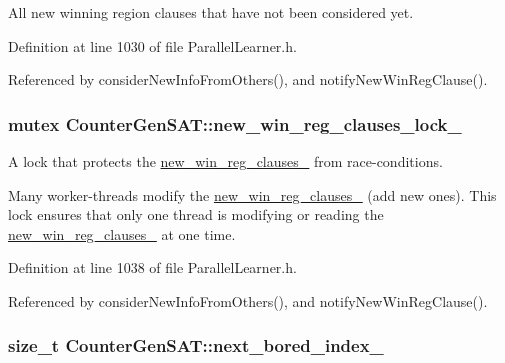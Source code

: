All new winning region clauses that have not been considered yet. 



Definition at line 1030 of file Parallel\-Learner.\-h.



Referenced by consider\-New\-Info\-From\-Others(), and notify\-New\-Win\-Reg\-Clause().

\hypertarget{classCounterGenSAT_a120e7ea918e720bedb9b35a40e354307}{
\subsubsection[{new\-\_\-win\-\_\-reg\-\_\-clauses\-\_\-lock\-\_\-}]{\setlength{\rightskip}{0pt plus 5cm}mutex Counter\-Gen\-S\-A\-T\-::new\-\_\-win\-\_\-reg\-\_\-clauses\-\_\-lock\-\_\-\hspace{0.3cm}{\ttfamily [protected]}}}\label{classCounterGenSAT_a120e7ea918e720bedb9b35a40e354307}


A lock that protects the \hyperlink{classCounterGenSAT_a5a379bda175a32e3d4ccc0771fde024d}{new\-\_\-win\-\_\-reg\-\_\-clauses\-\_\-} from race-\/conditions. 

Many worker-\/threads modify the \hyperlink{classCounterGenSAT_a5a379bda175a32e3d4ccc0771fde024d}{new\-\_\-win\-\_\-reg\-\_\-clauses\-\_\-} (add new ones). This lock ensures that only one thread is modifying or reading the \hyperlink{classCounterGenSAT_a5a379bda175a32e3d4ccc0771fde024d}{new\-\_\-win\-\_\-reg\-\_\-clauses\-\_\-} at one time. 

Definition at line 1038 of file Parallel\-Learner.\-h.



Referenced by consider\-New\-Info\-From\-Others(), and notify\-New\-Win\-Reg\-Clause().

\hypertarget{classCounterGenSAT_a404764a6142a0cd55e1b3e40d2e0483b}{
\subsubsection[{next\-\_\-bored\-\_\-index\-\_\-}]{\setlength{\rightskip}{0pt plus 5cm}size\-\_\-t Counter\-Gen\-S\-A\-T\-::next\-\_\-bored\-\_\-index\-\_\-\hspace{0.3cm}{\ttfamily [protected]}}}\label{classCounterGenSAT_a404764a6142a0cd55e1b3e40d2e0483b}


